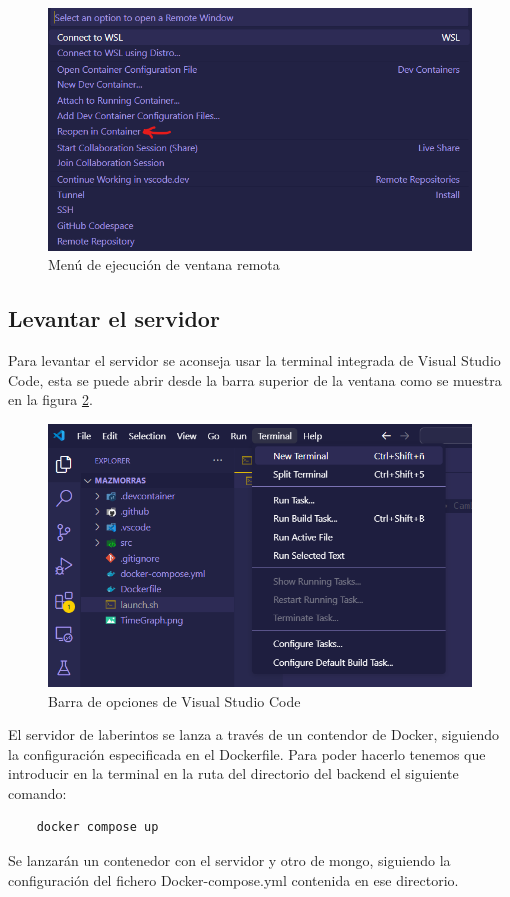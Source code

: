 \begin{figure}[!h]  
    \centering  
    \includegraphics[width=\textwidth]{img/reopencontainerdevcontainer.png}  
    \caption{Menú de ejecución de ventana remota}  
    \label{fig:remoteWindow}
\end{figure}

\subsection{Levantar el servidor}

Para levantar el servidor se aconseja usar la terminal integrada de Visual Studio Code, esta se puede abrir desde la barra superior de la ventana como se muestra en la figura \ref{fig:terminal}.
\begin{figure}[!h]  
    \centering  
    \includegraphics[width=\textwidth]{img/terminal.png}  
    \caption{Barra de opciones de Visual Studio Code}  
    \label{fig:terminal}
\end{figure}

El servidor de laberintos se lanza a través de un contendor de Docker, siguiendo la configuración especificada en el Dockerfile. Para poder hacerlo tenemos que introducir en la terminal en la ruta del directorio del backend el siguiente comando: 
\begin{lstlisting}
    docker compose up
\end{lstlisting}
Se lanzarán un contenedor con el servidor y otro de mongo, siguiendo la configuración del fichero Docker-compose.yml contenida en ese directorio.

